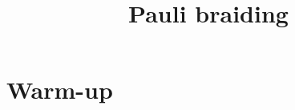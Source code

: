 



\part{Warm-up}
\label{book-part-warmup}

\title{Pauli braiding}
\label{chapter-paulibraiding}

\maketitle

\label{section-phantom}

\tableofcontents










